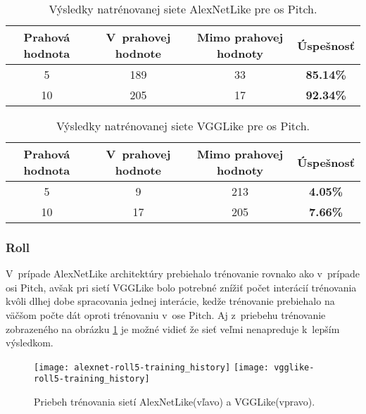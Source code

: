 \begin{table}[H]
    \centering
    \begin{tabular}{|c|c|c|c|}
        \hline
        Prahová hodnota & V~prahovej hodnote       & Mimo prahovej hodnoty    & Úspešnosť    \\ \hline
        5               & {\color[HTML]{009901} 189} & {\color[HTML]{9A0000} 33} & \textbf{85.14\%} \\ \hline
        10              & {\color[HTML]{009901} 205} & {\color[HTML]{9A0000} 17} & \textbf{92.34\%} \\ \hline
    \end{tabular}
    \caption{Výsledky natrénovanej siete AlexNetLike pre os Pitch.}
    \label{tab:alexnetpitchresults}
\end{table}
\begin{table}[H]
    \centering
    \begin{tabular}{|c|c|c|c|}
        \hline
        Prahová hodnota & V~prahovej hodnote       & Mimo prahovej hodnoty    & Úspešnosť    \\ \hline
        5               & {\color[HTML]{009901} 9} & {\color[HTML]{9A0000} 213} & \textbf{4.05\%} \\ \hline
        10              & {\color[HTML]{009901} 17} & {\color[HTML]{9A0000} 205} & \textbf{7.66\%} \\ \hline
    \end{tabular}
    \caption{Výsledky natrénovanej siete VGGLike pre os Pitch.}
    \label{tab:vgglikepitchresults}
\end{table}


\subsubsection{Roll}
V~prípade AlexNetLike architektúry prebiehalo trénovanie rovnako ako v~prípade osi Pitch,
    avšak pri sietí VGGLike bolo potrebné znížiť počet interácií trénovania kvôli dlhej dobe
    spracovania jednej interácie, kedže trénovanie prebiehalo na väčšom počte dát oproti trénovaniu v~ose Pitch.
Aj z~priebehu trénovanie zobrazeného na obrázku \ref{pic:rollaxis} je možné vidieť že sieť veľmi nenapreduje k~lepším výsledkom.

\begin{figure}[H]
    \centering
    \texttt{[image: alexnet-roll5-training\_history]}
	\texttt{[image: vgglike-roll5-training\_history]}
	\caption{Priebeh trénovania sietí AlexNetLike(vľavo) a VGGLike(vpravo).}
	\label{pic:rollaxis}
\end{figure}


